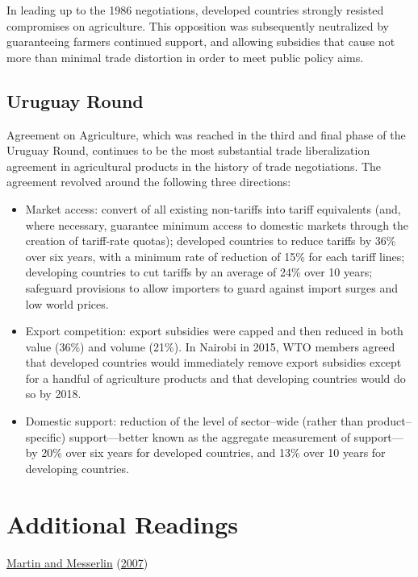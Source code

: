 \documentclass[
  oneside]{book}
\providecommand{\tightlist}{%
  \setlength{\itemsep}{0pt}\setlength{\parskip}{0pt}}
\begin{document}
In leading up to the 1986 negotiations, developed countries strongly resisted compromises on agriculture. This opposition was subsequently neutralized by guaranteeing farmers continued support, and allowing subsidies that cause not more than minimal trade distortion in order to meet public policy aims.

\hypertarget{uruguay-round}{%
\subsection{Uruguay Round}\label{uruguay-round}}

Agreement on Agriculture, which was reached in the third and final phase of the Uruguay Round, continues to be the most substantial trade liberalization agreement in agricultural products in the history of trade negotiations. The agreement revolved around the following three directions:

\begin{itemize}
\tightlist
\item
  Market access: convert of all existing non-tariffs into tariff equivalents (and, where necessary, guarantee minimum access to domestic markets through the creation of tariff-rate quotas); developed countries to reduce tariffs by 36\% over six years, with a minimum rate of reduction of 15\% for each tariff lines; developing countries to cut tariffs by an average of 24\% over 10 years; safeguard provisions to allow importers to guard against import surges and low world prices.
\item
  Export competition: export subsidies were capped and then reduced in both value (36\%) and volume (21\%). In Nairobi in 2015, WTO members agreed that developed countries would immediately remove export subsidies except for a handful of agriculture products and that developing countries would do so by 2018.
\item
  Domestic support: reduction of the level of sector--wide (rather than product--specific) support---better known as the aggregate measurement of support---by 20\% over six years for developed countries, and 13\% over 10 years for developing countries.
\end{itemize}

\hypertarget{additional-readings-1}{%
\section{Additional Readings}\label{additional-readings-1}}

\protect\hyperlink{ref-martin2007}{Martin and Messerlin} (\protect\hyperlink{ref-martin2007}{2007})
\end{document}
